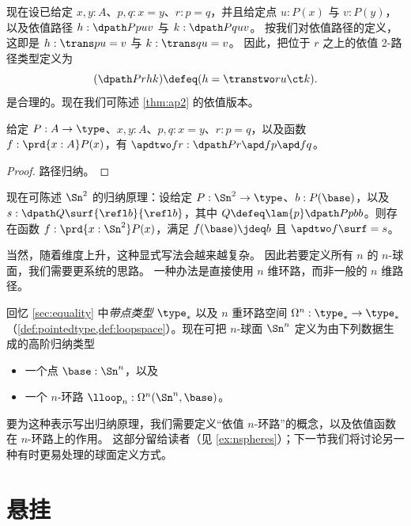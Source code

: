 现在设已给定 $x,y:A$、$p,q:x=y$、$r:p=q$，并且给定点 $u:P(x)$ 与 $v:P(y)$，以及依值路径 $h:\dpath P p u v$ 与 $k:\dpath P q u v$。
按我们对依值路径的定义，这即是 $h:\trans p u = v$ 与 $k:\trans q u = v$。
因此，把位于 $r$ 之上的依值 2-路径类型定义为
\[ (\dpath P r h k )\defeq (h = \transtwo r u \ct k). \]
是合理的。现在我们可陈述 \cref{thm:ap2} 的依值版本。

\begin{lem}\label{thm:apd2}
  给定 $P:A\to\type$、$x,y:A$、$p,q:x=y$、$r:p=q$，以及函数 $f:\prd{x:A} P(x)$，有
  $\apdtwo f r : \dpath P r {\apd f p}{\apd f q}$。
\end{lem}
\begin{proof}
  路径归纳。
\end{proof}

%
现在可陈述 $\Sn^2$ 的归纳原理：设给定 $P:\Sn^2\to\type$、$b:P(\base)$，以及 $s:\dpath Q \surf {\refl b}{\refl b}$，其中 $Q\defeq\lam{p} \dpath P p b b$。则存在函数 $f:\prd{x:\Sn^2} P(x)$，满足 $f(\base)\jdeq b$ 且 $\apdtwo f \surf = s$。

%

当然，随着维度上升，这种显式写法会越来越复杂。
因此若要定义所有 $n$ 的 $n$-球面，我们需要更系统的思路。
一种办法是直接使用 $n$ 维环路，而非一般的 $n$ 维路径。

%
回忆 \cref{sec:equality} 中\emph{带点类型} $\type_*$ 以及 $n$ 重环路空间 $\Omega^n : \type_* \to \type_*$
（\cref{def:pointedtype,def:loopspace}）。现在可把
$n$-球面 $\Sn^n$ 定义为由下列数据生成的高阶归纳类型
%
\begin{itemize}
\item 一个点 $\base:\Sn^n$，以及
\item 一个 $n$-环路 $\lloop_n : \Omega^n(\Sn^n,\base)$。
\end{itemize}
要为这种表示写出归纳原理，我们需要定义“依值 $n$-环路”的概念，以及依值函数在 $n$-环路上的作用。
这部分留给读者（见 \cref{ex:nspheres}）；下一节我们将讨论另一种有时更易处理的球面定义方式。
\section{悬挂}
\label{sec:suspension}

